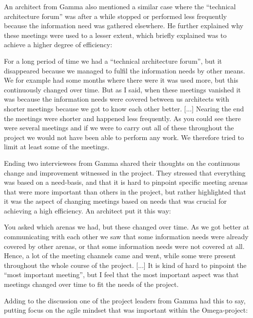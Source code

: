 An architect from Gamma also mentioned a similar case where the ``technical architecture forum'' was after a while stopped or performed less frequently because the information need was gathered elsewhere. He further explained why these meetings were used to a lesser extent, which briefly explained was to achieve a higher degree of efficiency:

\begin{fancyquotes}
For a long period of time we had a ``technical architecture forum'', but it disappeared because we managed to fulfil the information needs by other means. We for example had some months where there were it was used more, but this continuously changed over time. But as I said, when these meetings vanished it was because the information needs were covered between us architects with shorter meetings because we got to know each other better. [...] Nearing the end the meetings were shorter and happened less frequently. As you could see there were several meetings and if we were to carry out all of these throughout the project we would not have been able to perform any work. We therefore tried to limit at least some of the meetings.
\end{fancyquotes}

Ending two interviewees from Gamma shared their thoughts on the continuous change and improvement witnessed in the project. They stressed that everything was based on a need-basis, and that it is hard to pinpoint specific meeting arenas that were more important than others in the project, but rather highlighted that it was the aspect of changing meetings based on needs that was crucial for achieving a high efficiency. An architect put it this way:

\begin{fancyquotes}
You asked which arenas we had, but these changed over time. As we got better at communicating with each other we saw that some information needs were already covered by other arenas, or that some information needs were not covered at all. Hence, a lot of the meeting channels came and went, while some were present throughout the whole course of the project. [...] It is kind of hard to pinpoint the ``most important meeting'', but I feel that the most important aspect was that meetings changed over time to fit the needs of the project.
\end{fancyquotes}

Adding to the discussion one of the project leaders from Gamma had this to say, putting focus on the agile mindset that was important within the Omega-project:

